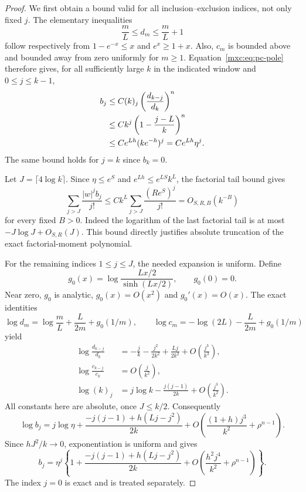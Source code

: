 \documentclass[11pt]{article}
\numberwithin{equation}{section}
\theoremstyle{definition}
\theoremstyle{remark}
\begin{document}
\begin{proof}
We first obtain a bound valid for all inclusion--exclusion indices,
not only fixed $j$.  The elementary inequalities
\[
 \frac mL\leq d_m\leq\frac mL+1
\]
follow respectively from $1-e^{-x}\leq x$ and
$e^x\geq1+x$.  Also, $c_m$ is bounded above and bounded away from
zero uniformly for $m\geq1$.  Equation~\eqref{mxc:eq:pc-pole} therefore
gives, for all sufficiently large $k$ in the indicated window and
$0\leq j\leq k-1$,
\begin{align}
 b_j
 &\leq C(k)_j\left(\frac{d_{k-j}}{d_k}\right)^n\notag\\
 &\leq Ck^j\left(1-\frac{j-L}{k}\right)^n\notag\\
 &\leq C e^{Lh}(k e^{-h})^j
 =C e^{Lh}\eta^j.
 \label{mxc:eq:pc-global}
\end{align}
The same bound holds for $j=k$ since $b_k=0$.

Let $J=\lceil4\log k\rceil$.  Since $\eta\leq e^S$ and
$e^{Lh}\leq e^{LS}k^L$, the factorial tail bound gives
\begin{equation}\label{mxc:eq:pc-tail}
 \sum_{j>J}\frac{|w|^j b_j}{j!}
 \leq C k^L\sum_{j>J}\frac{(R e^S)^j}{j!}
 =O_{S,R,B}(k^{-B})
\end{equation}
for every fixed $B>0$.  Indeed the logarithm of the last factorial
tail is at most $-J\log J+O_{S,R}(J)$.
This bound directly justifies absolute truncation of the exact
factorial-moment polynomial.

For the remaining indices $1\leq j\leq J$, the needed expansion is
uniform.  Define
\[
 g_0(x)=\log\frac{Lx/2}{\sinh(Lx/2)},\qquad g_0(0)=0.
\]
Near zero, $g_0$ is analytic, $g_0(x)=O(x^2)$ and $g_0'(x)=O(x)$. The exact
identities
\[
 \log d_m=\log\frac mL+\frac{L}{2m}+g_0(1/m),\qquad
 \log c_m=-\log(2L)-\frac{L}{2m}+g_0(1/m)
\]
yield
\begin{align*}
 \log\frac{d_{k-j}}{d_k}
 &=-\frac jk-\frac{j^2}{2k^2}
   +\frac{Lj}{2k^2}+O\!\left(\frac{j^3}{k^3}\right),\\
 \log\frac{c_{k-j}}{c_k}
 &=O\!\left(\frac j{k^2}\right),\\
 \log(k)_j
 &=j\log k-\frac{j(j-1)}{2k}
   +O\!\left(\frac{j^3}{k^2}\right).
\end{align*}
All constants here are absolute, once $J\leq k/2$.  Consequently
\begin{equation}\label{mxc:eq:pc-logmoment}
 \log b_j
 =j\log\eta+
 \frac{-j(j-1)+h(Lj-j^2)}{2k}
 +O\!\left(\frac{(1+h)j^3}{k^2}+\rho^{n-1}\right).
\end{equation}
Since $hJ^2/k\to0$, exponentiation is uniform and gives
\begin{equation}\label{mxc:eq:pc-momentexpansion}
 b_j=\eta^j\left\{
 1+\frac{-j(j-1)+h(Lj-j^2)}{2k}
 +O\!\left(\frac{h^2j^4}{k^2}+\rho^{n-1}\right)
 \right\}.
\end{equation}
The index $j=0$ is exact and is treated separately.


\end{proof}
\end{document}
